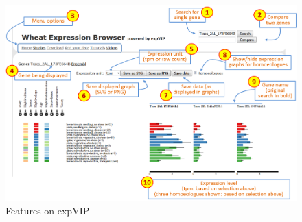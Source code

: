 \begin{figure}
\includegraphics[width=1\textwidth]{expVIP/tutorial/images/Figure1.png} 
\caption{Features on expVIP}
\label{fig:exp:tutorial1}
\end{figure}
